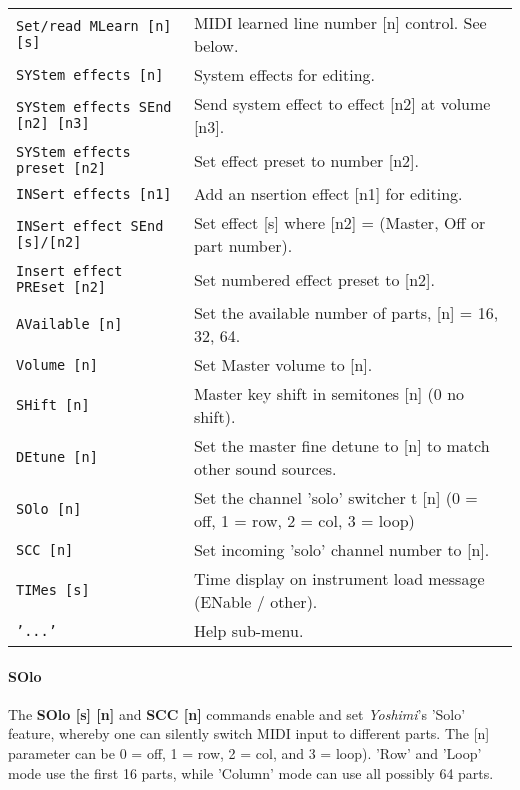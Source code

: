 \begin{table}[H]
\begin{tabular}{l l}
\texttt{Set/read MLearn [n] [s]} &
   MIDI learned line number [n] control.  See below. \\
\texttt{SYStem effects [n]} &
   System effects for editing. \\
\texttt{SYStem effects SEnd [n2] [n3]} &
   Send system effect to effect [n2] at volume [n3]. \\
\texttt{SYStem effects preset [n2]} &
   Set effect preset to number [n2]. \\
\texttt{INSert effects [n1]} &
   Add an nsertion effect [n1] for editing. \\
\texttt{INSert effect SEnd [s]/[n2]} &
   Set effect [s] where [n2] = (Master, Off or part number). \\
\texttt{Insert effect PREset [n2]} &
   Set numbered effect preset to [n2]. \\
\texttt{AVailable [n]} &
   Set the available number of parts, [n] = 16, 32, 64. \\
\texttt{Volume [n]} &
   Set Master volume to [n]. \\
\texttt{SHift [n]} &
   Master key shift in semitones [n] (0 no shift). \\
\texttt{DEtune [n]} &
   Set the master fine detune to [n] to match other sound sources. \\
\texttt{SOlo [n]} &
   Set the channel 'solo' switcher t [n]
   (0 = off, 1 = row, 2 = col, 3 = loop) \\
\texttt{SCC [n]} &
   Set incoming 'solo' channel number to [n]. \\
\texttt{TIMes [s]} &
   Time display on instrument load message (ENable / other). \\
\texttt{'...'} &
   Help sub-menu. \\

      \end{tabular}
   \end{table}

\paragraph{SOlo}
\label{paragraph:command_line_solo}

   The \textbf{SOlo [s] [n]} and \textbf{SCC [n]}
   commands enable and set \textsl{Yoshimi}'s 'Solo' feature,
   whereby one can silently switch MIDI input to different parts.
   The [n] parameter can be 0 = off, 1 = row, 2 = col, and 3 = loop).
   'Row' and 'Loop' mode use the first 16 parts, while
   'Column' mode can use all possibly 64 parts.

